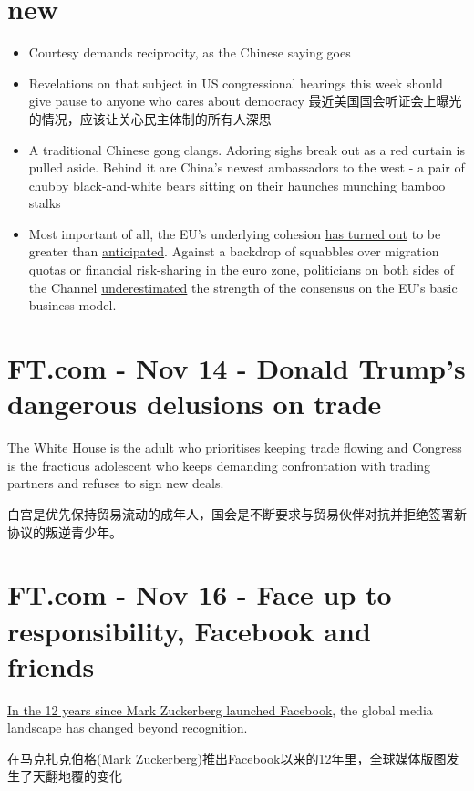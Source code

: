\documentclass[UTF8]{ctexart}
\begin{document}
\tableofcontents

\section{new}
\begin{itemize}
\item Courtesy demands reciprocity, as the Chinese saying goes

\item Revelations on that subject in US congressional hearings this week should give pause to anyone who cares about democracy 最近美国国会听证会上曝光的情况，应该让关心民主体制的所有人深思

\item A traditional Chinese gong clangs. Adoring sighs break out as a red curtain is pulled aside. Behind it are China's newest ambassadors to the west - a pair of chubby black-and-white bears sitting on their haunches munching bamboo stalks

\item Most important of all, the EU’s underlying cohesion \underline{has turned out} to be greater than \underline{anticipated}. Against a backdrop of squabbles over migration quotas or financial risk-sharing in the euro zone, politicians on both sides of the Channel \underline{underestimated} the strength of the consensus on the EU’s basic business model.
\end{itemize}

\section{FT.com - Nov 14 - Donald Trump’s dangerous delusions on trade}
The White House is the adult who prioritises keeping trade flowing and Congress is the fractious adolescent who keeps demanding confrontation with trading partners and refuses to sign new deals.

白宫是优先保持贸易流动的成年人，国会是不断要求与贸易伙伴对抗并拒绝签署新协议的叛逆青少年。

\section{FT.com - Nov 16 - Face up to responsibility, Facebook and friends}
\underline{In the 12 years since Mark Zuckerberg launched Facebook}, the global media landscape has changed beyond recognition.

在马克扎克伯格(Mark Zuckerberg)推出Facebook以来的12年里，全球媒体版图发生了天翻地覆的变化
\end{document}
